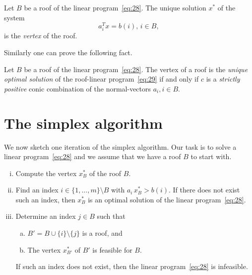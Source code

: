 \begin{definition}
  \label{def:5}
  Let $B$  be a roof of the linear program~\eqref{eq:28}. The unique
  solution 
  $x^*$  of  the
  system 
  \begin{equation}
    \label{eq:3}
 a_i^Tx = b(i), \, i \in B, 
  \end{equation}
  is the  \emph{vertex} of the roof. 
\end{definition}





Similarly one can prove the following fact. 

\begin{proposition}
  \label{prop:2}
  Let $B$ be a roof of the linear program~\eqref{eq:28}. 
    The vertex of a roof is the \emph{unique optimal solution} of the
    roof-linear program~\eqref{eq:29} if and only if   
    $c$ is a \emph{strictly positive} conic combination  of 
    the normal-vectors $a_i, i \in B$. 
\end{proposition}





\section{The simplex algorithm}
\label{sec:simplex-algorithm}


We now sketch one iteration of the simplex algorithm. Our task is to
solve a linear program~\eqref{eq:28} and we assume that we have a roof
$B$ to start with.


\begin{enumerate}[i)]
\item Compute the vertex $x^*_B$ of the roof $B$. \label{xitem:13}
\item Find an index $i \in  \{1,\ldots,m\}\setminus B$ with $a_i\,x^*_B>b(i)$. If
  there does not exist such an index, then $x^*_B$ is an optimal
  solution of the linear program~\eqref{eq:28}. \label{xitem:14} 
\item Determine an index $j \in B$ such that \label{xitem:17}
  \begin{enumerate}[a)]
  \item   $B' = B \cup \{i\} \setminus \{j\}$ is a roof, and \label{xitem:15}
  \item The vertex $x^*_{B'}$ of $B'$ is feasible for $B$. \label{xitem:16}
  \end{enumerate}
  If such an index does not exist, then the linear
  program~\eqref{eq:28} is infeasible. 
\end{enumerate}


